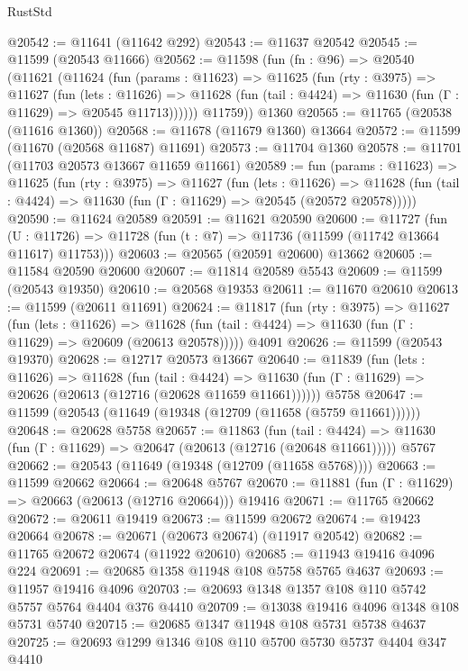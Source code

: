 \begin{lexlean}{RustStd}
\begin{coremodule}
@20542 := @11641 (@11642 @292)
@20543 := @11637 @20542
@20545 := @11599 (@20543 @11666)
@20562 := @11598
    (fun (fn : @96) =>
    @20540
      (@11621
        (@11624
          (fun (params : @11623) =>
          @11625
            (fun (rty : @3975) =>
            @11627
              (fun (lets : @11626) =>
              @11628 (fun (tail : @4424) => @11630 (fun (Γ : @11629) => @20545 @11713))))))
        @11759))
    @1360
@20565 := @11765 (@20538 (@11616 @1360))
@20568 := @11678 (@11679 @1360) @13664
@20572 := @11599 (@11670 (@20568 @11687) @11691)
@20573 := @11704 @1360
@20578 := @11701 (@11703 @20573 @13667 @11659 @11661)
@20589 := fun (params : @11623) =>
  @11625
    (fun (rty : @3975) =>
    @11627
      (fun (lets : @11626) =>
      @11628 (fun (tail : @4424) => @11630 (fun (Γ : @11629) => @20545 (@20572 @20578)))))
@20590 := @11624 @20589
@20591 := @11621 @20590
@20600 := @11727
    (fun (U : @11726) => @11728 (fun (t : @7) => @11736 (@11599 (@11742 @13664 @11617) @11753)))
@20603 := @20565 (@20591 @20600) @13662
@20605 := @11584 @20590 @20600
@20607 := @11814 @20589 @5543
@20609 := @11599 (@20543 @19350)
@20610 := @20568 @19353
@20611 := @11670 @20610
@20613 := @11599 (@20611 @11691)
@20624 := @11817
    (fun (rty : @3975) =>
    @11627
      (fun (lets : @11626) =>
      @11628 (fun (tail : @4424) => @11630 (fun (Γ : @11629) => @20609 (@20613 @20578)))))
    @4091
@20626 := @11599 (@20543 @19370)
@20628 := @12717 @20573 @13667
@20640 := @11839
    (fun (lets : @11626) =>
    @11628
      (fun (tail : @4424) =>
      @11630 (fun (Γ : @11629) => @20626 (@20613 (@12716 (@20628 @11659 @11661))))))
    @5758
@20647 := @11599 (@20543 (@11649 (@19348 (@12709 (@11658 (@5759 @11661))))))
@20648 := @20628 @5758
@20657 := @11863
    (fun (tail : @4424) => @11630 (fun (Γ : @11629) => @20647 (@20613 (@12716 (@20648 @11661)))))
    @5767
@20662 := @20543 (@11649 (@19348 (@12709 (@11658 @5768))))
@20663 := @11599 @20662
@20664 := @20648 @5767
@20670 := @11881 (fun (Γ : @11629) => @20663 (@20613 (@12716 @20664))) @19416
@20671 := @11765 @20662
@20672 := @20611 @19419
@20673 := @11599 @20672
@20674 := @19423 @20664
@20678 := @20671 (@20673 @20674) (@11917 @20542)
@20682 := @11765 @20672 @20674 (@11922 @20610)
@20685 := @11943 @19416 @4096 @224
@20691 := @20685 @1358 @11948 @108 @5758 @5765 @4637
@20693 := @11957 @19416 @4096
@20703 := @20693 @1348 @1357 @108 @110 @5742 @5757 @5764 @4404 @376 @4410
@20709 := @13038 @19416 @4096 @1348 @108 @5731 @5740
@20715 := @20685 @1347 @11948 @108 @5731 @5738 @4637
@20725 := @20693 @1299 @1346 @108 @110 @5700 @5730 @5737 @4404 @347 @4410

\end{coremodule}
\end{lexlean}
